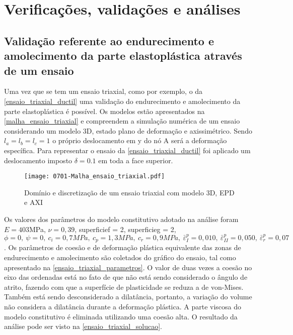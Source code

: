 \chapter{Verificações, validações e análises}\label{Algumas_verificacoes_validacoes}

\section{Validação referente ao endurecimento e amolecimento da parte elastoplástica através de um ensaio}

Uma vez que se tem um ensaio triaxial, como por exemplo, o da \autoref{ensaio_triaxial_ductil} uma validação do endurecimento e amolecimento da parte elastoplástica é possível. Os modelos estão apresentados na \autoref{malha_ensaio_triaxial} e compreendem a simulação numérica de um ensaio considerando um modelo 3D, estado plano de deformação e axissimétrico. Sendo $l_a = l_b = l_c = 1$ o próprio deslocamento em y do nó A será a deformação específica. Para representar o ensaio da \autoref{ensaio_triaxial_ductil} foi aplicado um deslocamento imposto $\delta = 0.1$ em toda a face superior.

\begin{figure}[H]
	\begin{center}
		\texttt{[image: 0701-Malha\_ensaio\_triaxial.pdf]}
	\end{center}
	\caption{\label{malha_ensaio_triaxial}Domínio e discretização de um ensaio triaxial com modelo 3D, EPD e AXI}
\end{figure}

Os valores dos parâmetros do modelo constitutivo adotado na análise foram $E = 403$MPa, $\nu = 0,39$,  superficief = 2, superficieg = 2, $\phi = 0,~\psi = 0,~c_i = 0,7MPa,~c_p = 1,3MPa,~c_r = 0,9MPa,~\bar \varepsilon^p_{I} = 0,010,~\bar \varepsilon^p_{II} = 0,050,~\bar \varepsilon^p_{r} = 0,07$. Os parâmetros de coesão e de deformação plástica equivalente das zonas de endurecimento e amolecimento são coletados do gráfico do ensaio, tal como apresentado na \autoref{ensaio_triaxial_parametros}. O valor de duas vezes a coesão no eixo das ordenadas está no fato de que não está sendo considerado o ângulo de atrito, fazendo com que a superfície de plasticidade se reduza a de von-Mises. Também está sendo desconsiderado a dilatância, portanto, a variação do volume não considera a dilatância durante a deformação plástica. A parte viscosa do modelo constitutivo é eliminada utilizando uma coesão alta. O resultado da análise pode ser visto na \autoref{ensaio_triaxial_solucao}.
 
